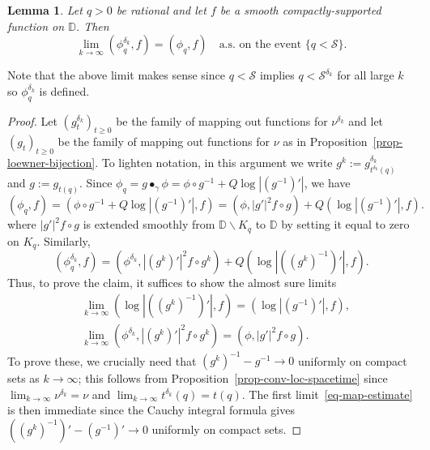 \documentclass[a4paper]{article}
\numberwithin{equation}{section}
\newcommand{\eqb}{\begin{equation}}
\newcommand{\eqe}{\end{equation}}
\newcommand{\D}{\mathbb{D}}
\newcommand{\qduration}{\mathcal{S}}
\newtheorem{lemma}[theorem]{Lemma}
\theoremstyle{remark}
\numberwithin{equation}{section}
\begin{document}
\begin{lemma}\label{lem-field-estimate}
Let $q>0$ be rational and let $f$ be a smooth compactly-supported function on $\D$. Then 
\[ \lim_{k \to \infty} (\phi_{q}^{\delta_k}, f) = (\phi_q, f)\quad \text{a.s.\ on the event }\{q < \qduration\}.\]
\end{lemma}
Note that the above limit makes sense since $q < \qduration$ implies $q < \qduration^{\delta_k}$ for all large $k$ so $\phi_{q}^{\delta_k}$ is defined.
\begin{proof}
Let $(g^{\delta_k}_t)_{t \geq 0}$ be the family of mapping out functions for $\nu^{\delta_k}$ and let $(g_t)_{t \geq 0}$ be the family of  mapping out functions for $\nu$ as in Proposition~\ref{prop-loewner-bijection}. 
To lighten notation, in this argument we write $g^k:= g^{\delta_k}_{t^{\delta_k}(q)}$ and $g:=g_{t(q)}$. 
    Since $\phi_q = g \bullet_\gamma \phi = \phi \circ g^{-1} + Q \log |(g^{-1})'|$, we have 
\eqb \nonumber
(\phi_q, f) = (\phi \circ g^{-1} + Q \log |(g^{-1})'|, f) = (\phi, |g'|^2 f\circ g) + Q (\log |(g^{-1})'|, f).
\eqe
where $|g'|^2 f\circ g$ is extended smoothly from $\D\backslash K_q$ to $\D$ by setting it equal to zero on $K_q$. Similarly,
\eqb \nonumber
(\phi_{q}^{\delta_k}, f) = (\phi^{\delta_k}, |(g^k)'|^2 f\circ g^k) + Q (\log |((g^k)^{-1})'|, f).
\eqe
Thus, to prove the claim, it suffices to show the almost sure limits
\begin{align} \label{eq-map-estimate}
    &\lim_{k \to \infty} (\log |((g^k)^{-1})'|, f) = (\log |(g^{-1})'|, f),\\
\label{eq-field-estimate}
&\lim_{k \to \infty} (\phi^{\delta_k}, |(g^k)'|^2 f\circ g^k) = (\phi, |g'|^2 f\circ g).
\end{align}
To prove these, we crucially need that $(g^k)^{-1} - g^{-1} \to 0$ uniformly on compact sets as $k \to \infty$; this follows from Proposition~\ref{prop-conv-loc-spacetime} since $\lim_{k \to \infty} \nu^{\delta_k} = \nu$ and $\lim_{k \to \infty} t^{\delta_k}(q) = t(q)$.
The first limit~\eqref{eq-map-estimate} is then immediate since the Cauchy integral formula gives $((g^k)^{-1})' - (g^{-1})' \to 0$ uniformly on compact sets. 



\end{proof}
\end{document}

